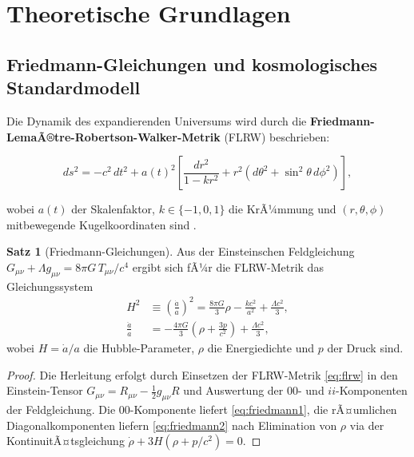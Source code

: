 ﻿\documentclass[a4paper,12pt]{article}
\theoremstyle{definition}
\newtheorem{satz}{Satz}[section]
\theoremstyle{remark}
\begin{document}
\section{Theoretische Grundlagen}
\label{sec:theorie}

\subsection{Friedmann-Gleichungen und kosmologisches Standardmodell}

Die Dynamik des expandierenden Universums wird durch die
\textbf{Friedmann-LemaÃ®tre-Robertson-Walker-Metrik} (FLRW) beschrieben:

\begin{equation}
  \label{eq:flrw}
  ds^2 = -c^2\,dt^2 + a(t)^2 \left[\frac{dr^2}{1-kr^2}
         + r^2\left(d\theta^2 + \sin^2\theta\,d\phi^2\right)\right],
\end{equation}

wobei $a(t)$ der Skalenfaktor, $k \in \{-1,0,1\}$ die KrÃ¼mmung und $(r,\theta,\phi)$
mitbewegende Kugelkoordinaten sind \cite{dodelson2003}.

\begin{satz}[Friedmann-Gleichungen]
  Aus der Einsteinschen Feldgleichung $G_{\mu\nu} + \Lambda g_{\mu\nu} = 8\pi G\, T_{\mu\nu}/c^4$
  ergibt sich fÃ¼r die FLRW-Metrik das Gleichungssystem
  \begin{align}
    \label{eq:friedmann1}
    H^2 &\equiv \left(\frac{\dot{a}}{a}\right)^2
       = \frac{8\pi G}{3}\rho - \frac{kc^2}{a^2} + \frac{\Lambda c^2}{3}, \\
    \label{eq:friedmann2}
    \frac{\ddot{a}}{a} &= -\frac{4\pi G}{3}\left(\rho + \frac{3p}{c^2}\right)
       + \frac{\Lambda c^2}{3},
  \end{align}
  wobei $H = \dot{a}/a$ die Hubble-Parameter, $\rho$ die Energiedichte und $p$
  der Druck sind.
\end{satz}

\begin{proof}
  Die Herleitung erfolgt durch Einsetzen der FLRW-Metrik \eqref{eq:flrw} in den
  Einstein-Tensor $G_{\mu\nu} = R_{\mu\nu} - \frac{1}{2}g_{\mu\nu}R$ und
  Auswertung der $00$- und $ii$-Komponenten der Feldgleichung. Die
  $00$-Komponente liefert \eqref{eq:friedmann1}, die rÃ¤umlichen Diagonalkomponenten
  liefern \eqref{eq:friedmann2} nach Elimination von $\rho$ via der
  KontinuitÃ¤tsgleichung $\dot\rho + 3H(\rho + p/c^2) = 0$.
\end{proof}
\end{document}

